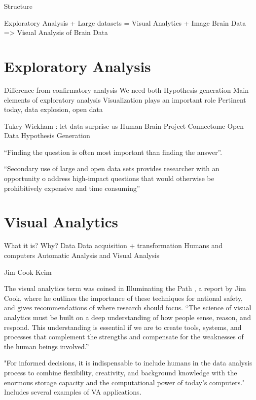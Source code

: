 
Structure

Exploratory Analysis + Large datasets  = Visual Analytics
+ Image Brain Data => Visual Analysis of Brain Data

\section{Exploratory Analysis}

Difference from confirmatory analysis
We need both
Hypothesis generation
Main elements of exploratory analysis
Visualization plays an important role
Pertinent today, data explosion, open data

Tukey
Wickham : let data surprise us
Human Brain Project
Connectome
Open Data
Hypothesis Generation

``Finding the question is often most important than finding the answer''\autocite{tukey_we_1980}.

``Secondary use of large and open data sets provides researcher with an opportunity o address high-impact questions that would otherwise be prohibitively expensive and time consuming'' \autocite{viangteeravat_giving_2014}



\section{Visual Analytics}

What it is?
Why?
Data 
Data acquisition + transformation
Humans and computers
Automatic Analysis and Visual Analysis


Jim Cook
Keim


The visual analytics term was coined in Illuminating the Path \autocite{cook_illuminating_2005}, a report by Jim Cook, where he outlines the importance of these techniques for national safety, and gives recommendations of 	where research should focus. ``The science of visual analytics must be built on a deep understanding of how
people sense, reason, and respond. This understanding is essential if we are to create
tools, systems, and processes that complement the strengths and compensate for the
weaknesses of the human beings involved.''


\autocite{keim_visual_2008} "For informed decisions, it is indispensable to include humans in the data analysis process to combine flexibility, creativity, and background knowledge with the enormous storage capacity and the computational power of today’s computers." Includes several examples of VA applications.

